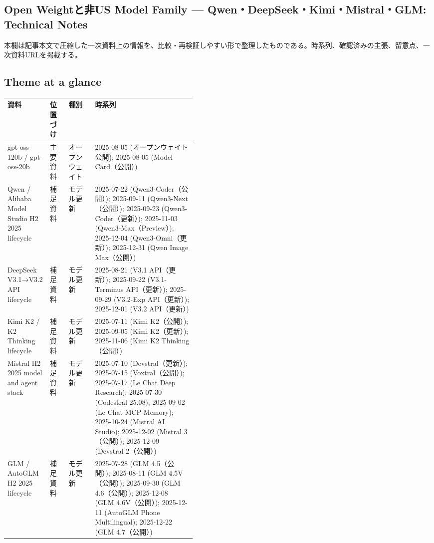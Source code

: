 \subsection*{Open Weightと非US Model Family — Qwen・DeepSeek・Kimi・Mistral・GLM: Technical Notes}
本欄は記事本文で圧縮した一次資料上の情報を、比較・再検証しやすい形で整理したものである。時系列、確認済みの主張、留意点、一次資料URLを掲載する。
\medskip
\subsection*{Theme at a glance}
\begin{center}
\footnotesize
\begin{tabularx}{\linewidth}{@{}p{0.20\linewidth}p{0.10\linewidth}p{0.14\linewidth}X@{}}
\toprule
資料 & 位置づけ & 種別 & 時系列 \\
\midrule
gpt-oss-120b / gpt-oss-20b & 主要資料 & オープンウェイト & 2025-08-05 (オープンウェイト公開); 2025-08-05 (Model Card（公開）)      \\
Qwen / Alibaba Model Studio H2 2025 lifecycle & 補足資料 & モデル更新 & 2025-07-22 (Qwen3-Coder（公開）); 2025-09-11 (Qwen3-Next（公開）); 2025-09-23 (Qwen3-Coder（更新）); 2025-11-03 (Qwen3-Max（Preview）); 2025-12-04 (Qwen3-Omni（更新）); 2025-12-31 (Qwen Image Max（公開）)      \\
DeepSeek V3.1→V3.2 API lifecycle & 補足資料 & モデル更新 & 2025-08-21 (V3.1 API（更新）); 2025-09-22 (V3.1-Terminus API（更新）); 2025-09-29 (V3.2-Exp API（更新）); 2025-12-01 (V3.2 API（更新）)      \\
Kimi K2 / K2 Thinking lifecycle & 補足資料 & モデル更新 & 2025-07-11 (Kimi K2（公開）); 2025-09-05 (Kimi K2（更新）); 2025-11-06 (Kimi K2 Thinking（公開）)      \\
Mistral H2 2025 model and agent stack & 補足資料 & モデル更新 & 2025-07-10 (Devstral（更新）); 2025-07-15 (Voxtral（公開）); 2025-07-17 (Le Chat Deep Research); 2025-07-30 (Codestral 25.08); 2025-09-02 (Le Chat MCP Memory); 2025-10-24 (Mistral AI Studio); 2025-12-02 (Mistral 3（公開）); 2025-12-09 (Devstral 2（公開）)      \\
GLM / AutoGLM H2 2025 lifecycle & 補足資料 & モデル更新 & 2025-07-28 (GLM 4.5（公開）); 2025-08-11 (GLM 4.5V（公開）); 2025-09-30 (GLM 4.6（公開）); 2025-12-08 (GLM 4.6V（公開）); 2025-12-11 (AutoGLM Phone Multilingual); 2025-12-22 (GLM 4.7（公開）)      \\
\bottomrule
\end{tabularx}
\end{center}
\normalsize

